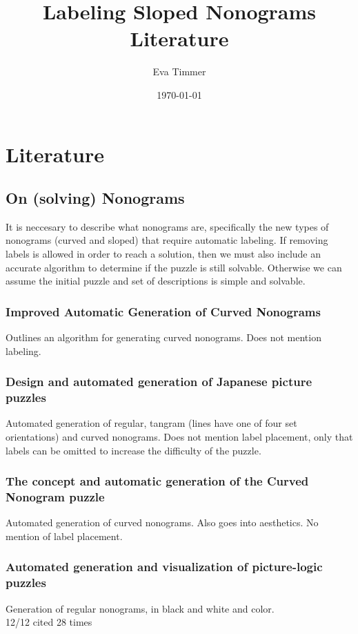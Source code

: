\documentclass[a4paper]{article}
\title{Labeling Sloped Nonograms Literature}
\author{Eva Timmer}
\date{\today}
\begin{document}
\maketitle

\section{Literature}
\subsection{On (solving) Nonograms}
It is neccesary to describe what nonograms are, specifically the new types of nonograms (curved and sloped) that require automatic labeling. If removing labels is allowed in order to reach a solution, then we must also include an accurate algorithm to determine if the puzzle is still solvable. Otherwise we can assume the initial puzzle and set of descriptions is simple and solvable.\\
\subsubsection{Improved Automatic Generation of Curved Nonograms \cite{van2017improved}}
Outlines an algorithm for generating curved nonograms. Does not mention labeling.

\subsubsection{Design and automated generation of Japanese picture puzzles \cite{van2019design}}
Automated generation of regular, tangram (lines have one of four set orientations) and curved nonograms.  Does not mention label placement, only that labels can be omitted to increase the difficulty of the puzzle.

\subsubsection{The concept and automatic generation of the Curved Nonogram puzzle \cite{de2016concept}}
Automated generation of curved nonograms. Also goes into aesthetics. No mention of label placement.

\subsubsection{Automated generation and visualization of picture-logic puzzles \cite{ortiz2007automated}}
Generation of regular nonograms, in black and white and color. \\
12/12 cited 28 times
\end{document}
